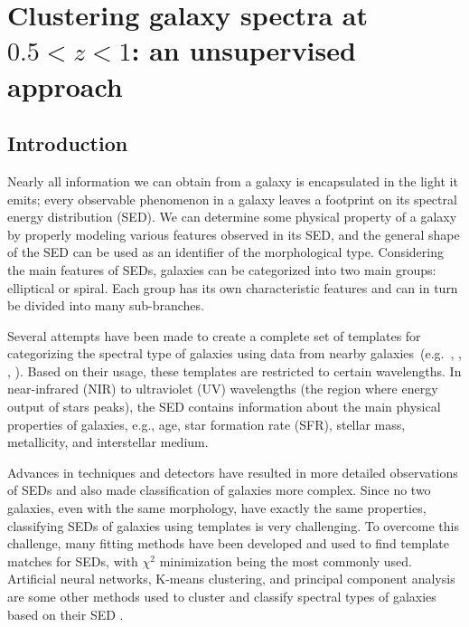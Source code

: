 \chapter[SOM: classifying high $Z$ galaxies]{Clustering galaxy spectra at $0.5<z<1$: an unsupervised approach}
\section{Introduction}
\label{sec: intro}
Nearly all information we can obtain from a galaxy is encapsulated in the light it emits; every observable phenomenon in a galaxy leaves a footprint on its spectral energy distribution (SED).
We can determine some physical property of a galaxy by properly modeling various features observed in its SED, and the general shape of the SED can be used as an identifier of the morphological type.
Considering the main features of SEDs, galaxies can be categorized into two main groups: elliptical or spiral.
Each group has its own characteristic features and can in turn be divided into many sub-branches.

Several attempts have been made to create a complete set of templates for categorizing the spectral type of galaxies using data from nearby galaxies~(e.g.~\citealt{Kinney93}, \citealt[][hereafter ]{Kinney96}, \citealt{Bershady00}, \citealt{Mannucci01}). 
Based on their usage, these templates are restricted to certain wavelengths.
In near-infrared (NIR) to ultraviolet (UV) wavelengths (the region where energy output of stars peaks), the SED contains information about the main physical properties of galaxies, e.g., age, star formation rate (SFR), stellar mass, metallicity, and interstellar medium.



Advances in techniques and detectors have resulted in more detailed observations of SEDs and also made classification of galaxies more complex.
Since no two galaxies, even with the same morphology, have exactly the same properties, classifying SEDs of galaxies using templates is very challenging.
To overcome this challenge, many fitting methods have been developed and used to find template matches for SEDs, with $\chi^2$ minimization being the most commonly used. 
Artificial neural networks, K-means clustering, and principal component analysis are some other methods used to cluster and classify spectral types of galaxies based on their SED \citep[e.g.][]{Allen13,Ordov14,Shi15}.

